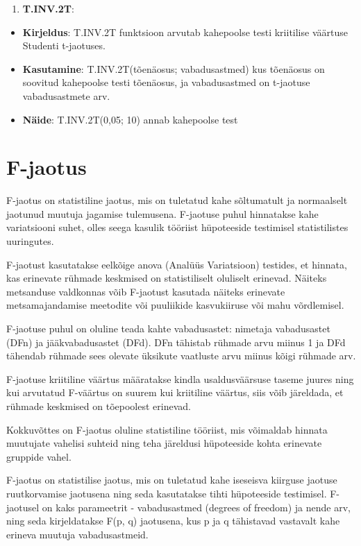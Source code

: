 \documentclass[
]{book}
\providecommand{\tightlist}{%
  \setlength{\itemsep}{0pt}\setlength{\parskip}{0pt}}
\begin{document}
\begin{enumerate}
\def\labelenumi{\arabic{enumi}.}
\setcounter{enumi}{4}
\tightlist
\item
  \textbf{T.INV.2T}:
\end{enumerate}

\begin{itemize}
\tightlist
\item
  \textbf{Kirjeldus}: T.INV.2T funktsioon arvutab kahepoolse testi kriitilise väärtuse Studenti t-jaotuses.
\item
  \textbf{Kasutamine}: T.INV.2T(tõenäosus; vabadusastmed) kus tõenäosus on soovitud kahepoolse testi tõenäosus, ja vabadusastmed on t-jaotuse vabadusastmete arv.
\item
  \textbf{Näide}: T.INV.2T(0,05; 10) annab kahepoolse test
\end{itemize}

\section{F-jaotus}\label{f-jaotus}

F-jaotus on statistiline jaotus, mis on tuletatud kahe sõltumatult ja normaalselt jaotunud muutuja jagamise tulemusena. F-jaotuse puhul hinnatakse kahe variatsiooni suhet, olles seega kasulik tööriist hüpoteeside testimisel statistilistes uuringutes.

F-jaotust kasutatakse eelkõige anova (Analüüs Variatsioon) testides, et hinnata, kas erinevate rühmade keskmised on statistiliselt oluliselt erinevad. Näiteks metsanduse valdkonnas võib F-jaotust kasutada näiteks erinevate metsamajandamise meetodite või puuliikide kasvukiiruse või mahu võrdlemisel.

F-jaotuse puhul on oluline teada kahte vabadusastet: nimetaja vabadusastet (DFn) ja jääkvabadusastet (DFd). DFn tähistab rühmade arvu miinus 1 ja DFd tähendab rühmade sees olevate üksikute vaatluste arvu miinus kõigi rühmade arv.

F-jaotuse kriitiline väärtus määratakse kindla usaldusväärsuse taseme juures ning kui arvutatud F-väärtus on suurem kui kriitiline väärtus, siis võib järeldada, et rühmade keskmised on tõepoolest erinevad.

Kokkuvõttes on F-jaotus oluline statistiline tööriist, mis võimaldab hinnata muutujate vahelisi suhteid ning teha järeldusi hüpoteeside kohta erinevate gruppide vahel.

F-jaotus on statistilise jaotus, mis on tuletatud kahe iseseisva kiirguse jaotuse ruutkorvamise jaotusena ning seda kasutatakse tihti hüpoteeside testimisel. F-jaotusel on kaks parameetrit - vabadusastmed (degrees of freedom) ja nende arv, ning seda kirjeldatakse F(p, q) jaotusena, kus p ja q tähistavad vastavalt kahe erineva muutuja vabadusastmeid.
\end{document}
